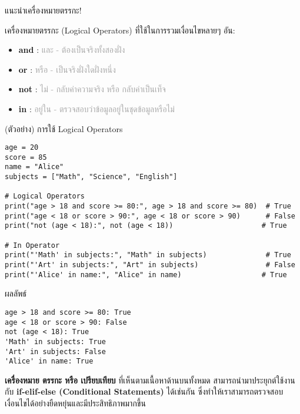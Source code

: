 \documentclass[12pt,a4paper]{article}
\newcommand{\textlight}[1]{{\thailightfont #1}}
\begin{document}
\begin{noticebox}{แนะนำเครื่องหมายตรรกะ!}

\textlight{เครื่องหมายตรรกะ (Logical Operators) ที่ใช้ในการรวมเงื่อนไขหลายๆ อัน:}

\begin{itemize}
    \item \textbf{and} : \textcolor{darkgray}{และ - ต้องเป็นจริงทั้งสองฝั่ง}
    \item \textbf{or} : \textcolor{darkgray}{หรือ - เป็นจริงฝั่งใดฝั่งหนึ่ง}
    \item \textbf{not} : \textcolor{darkgray}{ไม่ - กลับค่าความจริง หรือ กลับค่าเป็นเท็จ}
    \item \textbf{in} : \textcolor{darkgray}{อยู่ใน - ตรวจสอบว่าข้อมูลอยู่ในชุดข้อมูลหรือไม่}
\end{itemize}

\begin{codebox}{(ตัวอย่าง) การใช้ Logical Operators}
\begin{lstlisting}[style=python]
age = 20
score = 85
name = "Alice"
subjects = ["Math", "Science", "English"]

# Logical Operators
print("age > 18 and score >= 80:", age > 18 and score >= 80)  # True
print("age < 18 or score > 90:", age < 18 or score > 90)      # False
print("not (age < 18):", not (age < 18))                     # True

# In Operator
print("'Math' in subjects:", "Math" in subjects)              # True
print("'Art' in subjects:", "Art" in subjects)                # False
print("'Alice' in name:", "Alice" in name)                   # True
\end{lstlisting}
\end{codebox}

\begin{resultbox}{ผลลัพธ์}
\begin{verbatim}
age > 18 and score >= 80: True
age < 18 or score > 90: False
not (age < 18): True
'Math' in subjects: True
'Art' in subjects: False
'Alice' in name: True
\end{verbatim}
\end{resultbox}

\end{noticebox}

\textlight{\textbf{เครื่องหมาย ตรรกะ หรือ เปรียบเทียบ} ที่เห็นตามเนื้อหาด้านบนทั้งหมด สามารถนำมาประยุกต์ใช้งานกับ \textbf{if-elif-else (Conditional Statements)} ได้เช่นกัน ซึ่งทำให้เราสามารถตรวจสอบเงื่อนไขได้อย่างยืดหยุ่นและมีประสิทธิภาพมากขึ้น}
\end{document}
